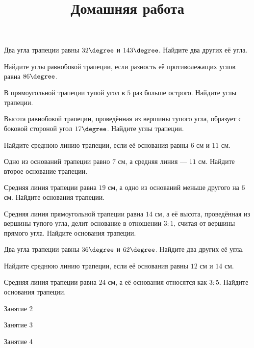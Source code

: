 %
%

\begin{class}[number=1]
	\begin{listofex}
		\item Два угла трапеции равны \( 32\degree \) и \( 143\degree \). Найдите два других её угла.
		\item Найдите углы равнобокой трапеции, если разность её противолежащих углов равна \( 86\degree \).
		\item В прямоугольной трапеции тупой угол в \( 5 \) раз больше острого. Найдите углы трапеции.
		\item Высота равнобокой трапеции, проведённая из вершины тупого угла, образует с боковой стороной угол \( 17\degree \). Найдите углы трапеции.
		\item Найдите среднюю линию трапеции, если её основания равны \( 6 \) см и \( 11 \) см.
		\item Одно из оснований трапеции равно \( 7 \) см, а средняя линия --- \( 11 \) см. Найдите второе основание трапеции.
		\item Средняя линия трапеции равна \( 19 \) см, а одно из оснований меньше другого на \( 6 \) см. Найдите основания трапеции.
		\item Средняя линия прямоугольной трапеции равна \( 14 \) см, а её высота, проведённая из вершины тупого угла, делит основание в отношении \( 3:1 \), считая от вершины прямого угла. Найдите основания трапеции.
	\end{listofex}
	\newpage
	\title{Домашняя работа}
	\begin{listofex}
		\item Два угла трапеции равны \( 36\degree \) и \( 62\degree \). Найдите два других её угла.
		\item Найдите среднюю линию трапеции, если её основания равны \( 12 \) см и \( 14 \) см.
		\item Средняя линия трапеции равна \( 24 \) см, а её основания относятся как \( 3:5 \). Найдите основания трапеции.
	\end{listofex}
\end{class}

\begin{class}[number=2]
	\begin{listofex}
		\item Занятие 2
	\end{listofex}
\end{class}

\begin{class}[number=3]
	\begin{listofex}
		\item Занятие 3 
	\end{listofex}
\end{class}

\begin{class}[number=4]
	\begin{listofex}
		\item Занятие 4
	\end{listofex}
\end{class}
